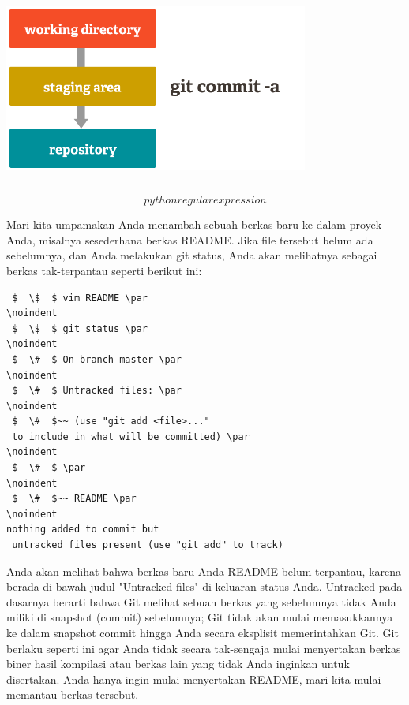\includegraphics[width=10cm,height=7cm]{Figures/dapigit2.jpg}
\begin{equation}python regular expression\end{equation}


Mari kita umpamakan Anda menambah sebuah berkas baru ke dalam proyek Anda, misalnya sesederhana berkas README. Jika file tersebut belum ada sebelumnya, dan Anda melakukan git status, Anda akan melihatnya sebagai berkas tak-terpantau seperti berikut ini: \par
\vspace{12pt}
\noindent 
\begin{verbatim}
 $  \$  $ vim README \par
\noindent 
 $  \$  $ git status \par
\noindent 
 $  \#  $ On branch master \par
\noindent 
 $  \#  $ Untracked files: \par
\noindent 
 $  \#  $~~ (use "git add <file>..." 
 to include in what will be committed) \par
\noindent 
 $  \#  $ \par
\noindent 
 $  \#  $~~ README \par
\noindent 
nothing added to commit but
 untracked files present (use "git add" to track) 

\end{verbatim}
Anda akan melihat bahwa berkas baru Anda README belum terpantau, karena berada di bawah judul "Untracked files" di keluaran status Anda. Untracked pada dasarnya berarti bahwa Git melihat sebuah berkas yang sebelumnya tidak Anda miliki di snapshot (commit) sebelumnya; Git tidak akan mulai memasukkannya ke dalam snapshot commit hingga Anda secara eksplisit memerintahkan Git. Git berlaku seperti ini agar Anda tidak secara tak-sengaja mulai menyertakan berkas biner hasil kompilasi atau berkas lain yang tidak Anda inginkan untuk disertakan. Anda hanya ingin mulai menyertakan README, mari kita mulai memantau berkas tersebut. \par
\vspace{12pt}
\noindent 
